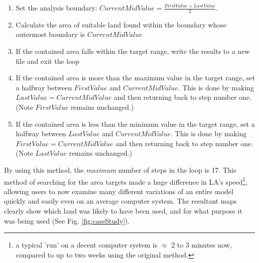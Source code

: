   \begin{enumerate} 
  
  \item Set the analysis boundary: $CurrentMidValue=\frac{FirstValue +
  LastValue}{2}$.  
  
  \item Calculate the area of suitable land found within the boundary whose
  outermost boundary is $CurrentMidValue$ 
  
  \item If the contained area falls within the target range, write the results
  to a new file and exit the loop 
  
  \item If the contained area is more than the maximum value in the target
  range, set a halfway between $FirstValue$ and $CurrentMidValue$. This is done
  by making $LastValue=CurrentMidValue$ and then returning back to step number
  one.  (Note $FirstValue$ remains unchanged.) 
  
  \item If the contained area is less than the minimum value in the target
  range, set a halfway between $LastValue$ and $CurrentMidValue$. This is done
  by making $FirstValue=CurrentMidValue$ and then returning back to step number
  one.  (Note $LastValue$ remains unchanged.) 
  
  \end{enumerate}

By using this method, the \textit{maximum} number of steps in the loop is 17.
This method of searching for the area targets made a huge difference in LA's
speed\footnote{ a typical 'run' on a decent computer system is $\approx$ 2 to 3
minutes now, compared to up to two weeks using the original method.}, allowing
users to now examine many different variations of an entire model quickly and
easily even on an average computer system.  The resultant maps clearly show
which land was likely to have been used, and for what purpose it was being used
(See Fig. \ref{fig:caseStudy}).
 
